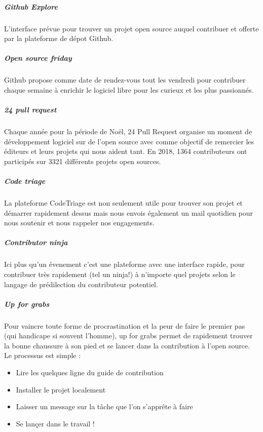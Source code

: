 				\subparagraph{Github Explore\\}
				L'interface prévue pour trouver un projet open source auquel contribuer et offerte par la plateforme de dépot Github.

				\subparagraph{Open source friday\\}
				Github propose comme date de rendez-vous tout les vendredi pour contribuer chaque semaine à enrichir le logiciel libre pour les curieux et les plus passionnés.

				\subparagraph{24 pull request\\}

				Chaque année pour la période de Noël, 24 Pull Request organise un moment de développement logiciel sur de l'open source avec comme objectif de remercier les éditeurs et leurs projets qui nous aident tant.
				En 2018, 1364 contributeurs ont participés sur 3321 différents projets open sources.

				\subparagraph{Code triage\\}

				La plateforme CodeTriage est non seulement utile pour trouver son projet et démarrer rapidement dessus mais nous envois également un mail quotidien pour nous soutenir et nous rappeler nos engagements.

				\subparagraph{Contributor ninja\\}

				Ici plus qu'un évenement c'est une plateforme avec une interface rapide, pour contribuer très rapidement (tel un ninja!) à n'importe quel projets selon le langage de prédilection du contributeur potentiel.

				\subparagraph{Up for grabs}

				Pour vaincre toute forme de procrastination et la peur de faire le premier pas (qui handicape si souvent l'homme), up for grabs permet de rapidement trouver la bonne chaussure à son pied et se lancer dans la contribution à l'open source. Le processus est simple :

				\begin{itemize}[label=\textbullet, font=\LARGE \color{burntorange}]
					\item Lire les quelques ligne du guide de contribution
					\item Installer le projet localement
					\item Laisser un message sur la tâche que l'on s'apprête à faire
					\item Se lançer dans le travail !
				\end{itemize}

